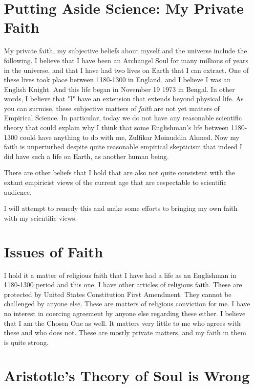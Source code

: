 \documentclass{amsart}
\begin{document}
\section{Putting Aside Science: My Private Faith}

My private faith, my subjective beliefs about myself and the universe include the following.  I believe that I have been an Archangel Soul for many millions of years in the universe, and that I have had two lives on Earth that I can extract.  One of these lives took place between 1180-1300 in England, and I believe I was an English Knight.  And this life began in November 19 1973 in Bengal.  In other words, I believe that "I" have an extension that extends beyond physical life.  As you can surmise, these subjective matters of {\em faith} are not yet matters of Empirical Science.  In particular, today we do not have any reasonable scientific theory that could explain why I think that some Englishman's life between 1180-1300 could have anything to do with me, Zulfikar Moinuddin Ahmed.  Now my faith is unperturbed despite quite reasonable empirical skepticism that indeed I did have such a life on Earth, as another human being.

There are other beliefs that I hold that are also not quite consistent with the extant empiricist views of the current age that are respectable to scientific audience.  

I will attempt to remedy this and make some efforts to bringing my own faith with my scientific views.

\section{Issues of Faith}

I hold it a matter of religious faith that I have had a life as an Englishman in 1180-1300 period and this one.  I have other articles of religious faith.  These are protected by United States Constitution First Amendment.  They cannot be challenged by anyone else.  These are matters of religious conviction for me.  I have no interest in coercing agreement by anyone else regarding these either.  I believe that I am the Chosen One as well.  It matters very little to me who agrees with these and who does not.  These are mostly private matters, and my faith in them is quite strong.

\section{Aristotle's Theory of Soul is Wrong}
\end{document}
